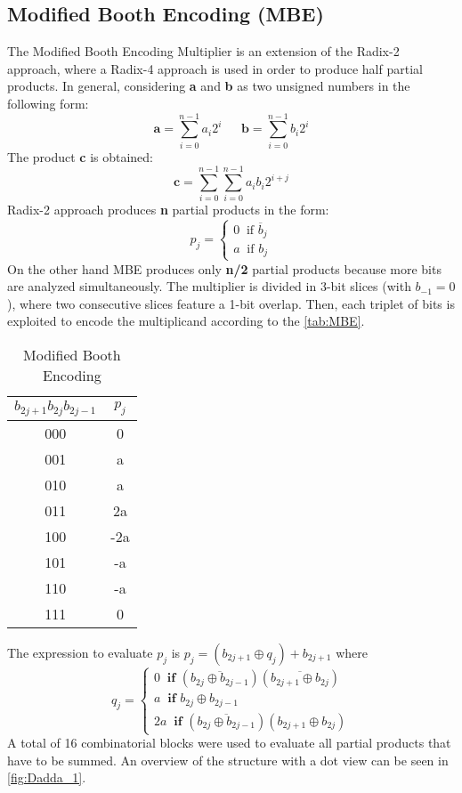\subsection{Modified Booth Encoding (MBE)}
The Modified Booth Encoding Multiplier is an extension of the Radix-2 approach, where a Radix-4 approach is used in order to produce half partial products. In general, considering \textbf{a} and \textbf{b} as two unsigned numbers in the following form:
$$
\textbf{a} = \sum_{i=0}^{n-1}a_i2^i\ \ \ \ \ \ \  \textbf{b} = \sum_{i=0}^{n-1}b_i2^i
$$
The product \textbf{c} is obtained:
$$
\textbf{c} = \sum_{i=0}^{n-1}\sum_{i=0}^{n-1}a_ib_i2^{i+j}
$$
Radix-2 approach produces \textbf{n} partial products in the form:
$$
p_j =
\begin{cases}
0 \ \textrm{  if   } \overline{b}_j\\
a \ \textrm{  if   } {b}_j
\end{cases}
$$
On the other hand MBE produces only \textbf{n/2} partial products because more bits are analyzed simultaneously. The multiplier is divided in 3-bit slices (with $b_{-1} = 0$), where two consecutive slices feature a 1-bit overlap. Then, each triplet of bits is exploited to encode the multiplicand according to the \autoref{tab:MBE}.
\begin{table}[htb]
	\centering
	\begin{tabular}{cc}
		$b_{2j+1}b_{2j}b_{2j-1}$ & $p_j$ \\
		\hline
		000 & 0 \\
		001 & a \\
		010 & a \\
		011 & 2a \\
		100 & -2a \\
		101 & -a \\
		110 & -a \\
		111 & 0 \\
	\end{tabular}
	\label{tab:MBE}
	\caption{Modified Booth Encoding}
\end{table}
The expression to evaluate $p_j$ is $p_j = (b_{2j+1} \oplus q_j) + b_{2j+1}$ where
$$ q_j=
\begin{cases}
0 \ \textbf{  if   } (\overline{b_{2j} \oplus b_{2j-1}})(\overline{b_{2j+1} \oplus b_{2j}})\\
a \ \textbf{  if   } b_{2j} \oplus b_{2j-1}\\
2a \ \textbf{  if   } (\overline{b_{2j} \oplus b_{2j-1}})(b_{2j+1} \oplus b_{2j})
\end{cases}
$$
A total of 16 combinatorial blocks were used to evaluate all partial products that have to be summed. An overview of the structure with a dot view can be seen in \autoref{fig:Dadda_1}.
